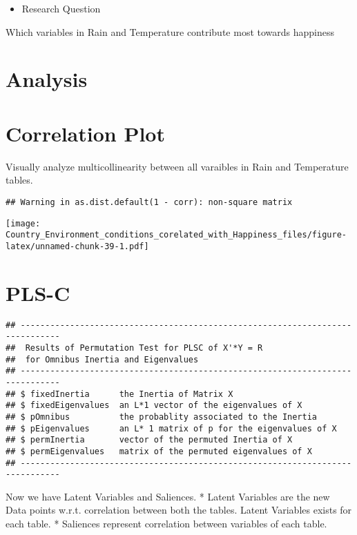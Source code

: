 \documentclass[]{book}
\providecommand{\tightlist}{%
  \setlength{\itemsep}{0pt}\setlength{\parskip}{0pt}}
\begin{document}
\begin{itemize}
\tightlist
\item
  Research Question
\end{itemize}

Which variables in Rain and Temperature contribute most towards
happiness

\hypertarget{analysis}{%
\section{Analysis}\label{analysis}}

\hypertarget{correlation-plot-2}{%
\section{Correlation Plot}\label{correlation-plot-2}}

Visually analyze multicollinearity between all varaibles in Rain and
Temperature tables.

\begin{verbatim}
## Warning in as.dist.default(1 - corr): non-square matrix
\end{verbatim}

\texttt{[image: Country\_Environment\_conditions\_corelated\_with\_Happiness\_files/figure-latex/unnamed-chunk-39-1.pdf]}

\hypertarget{pls-c}{%
\section{PLS-C}\label{pls-c}}

\begin{verbatim}
## ------------------------------------------------------------------------------
##  Results of Permutation Test for PLSC of X'*Y = R 
##  for Omnibus Inertia and Eigenvalues 
## ------------------------------------------------------------------------------
## $ fixedInertia      the Inertia of Matrix X
## $ fixedEigenvalues  an L*1 vector of the eigenvalues of X
## $ pOmnibus          the probablity associated to the Inertia
## $ pEigenvalues      an L* 1 matrix of p for the eigenvalues of X
## $ permInertia       vector of the permuted Inertia of X
## $ permEigenvalues   matrix of the permuted eigenvalues of X
## ------------------------------------------------------------------------------
\end{verbatim}

Now we have Latent Variables and Saliences. * Latent Variables are the
new Data points w.r.t. correlation between both the tables. Latent
Variables exists for each table. * Saliences represent correlation
between variables of each table.
\end{document}

